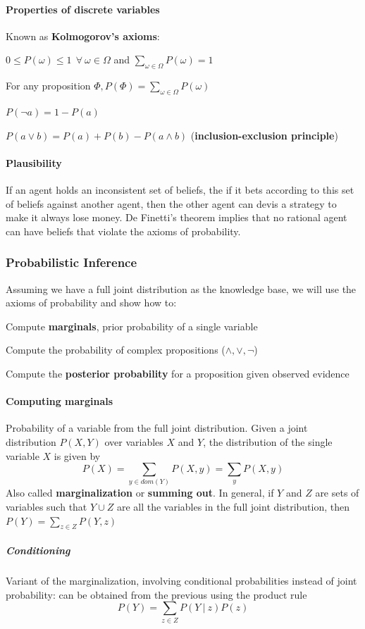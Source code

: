 \documentclass[10pt]{report}
\begin{document}
\paragraph{Properties of discrete variables} Known as \textbf{Kolmogorov's axioms}:
\begin{list}{}{}
	\item $0\leq P(\omega)\leq 1\:\:\forall\:\omega\in\Omega$ and $\sum_{\omega\in\Omega}P(\omega)=1$
	\item For any proposition $\Phi,P(\Phi)=\sum_{\omega\in\Omega}P(\omega)$
	\item $P(\neg a)=1-P(a)$
	\item $P(a\vee b) = P(a) + P(b) - P(a\wedge b)$ (\textbf{inclusion-exclusion principle})
\end{list}
\paragraph{Plausibility} If an agent holds an inconsistent set of beliefs, the if it bets according to this set of beliefs against another agent, then the other agent can devis a strategy to make it always lose money. De Finetti's theorem implies that no rational agent can have beliefs that violate the axioms of probability.
\subsubsection{Probabilistic Inference} Assuming we have a full joint distribution as the knowledge base, we will use the axioms of probability and show how to:
\begin{list}{}{}
	\item Compute \textbf{marginals}, prior probability of a single variable
	\item Compute the probability of complex propositions ($\wedge,\vee,\neg$)
	\item Compute the \textbf{posterior probability} for a proposition given observed evidence
\end{list}
\paragraph{Computing marginals} Probability of a variable from the full joint distribution. Given a joint distribution $P(X,Y)$ over variables $X$ and $Y$, the distribution of the single variable $X$ is given by $$P(X) = \sum_{y\in dom(Y)}P(X,y) = \sum_y P(X,y)$$
Also called \textbf{marginalization} or \textbf{summing out}. In general, if $Y$ and $Z$ are sets of variables such that $Y\cup Z$ are all the variables in the full joint distribution, then $P(Y) = \sum_{z\in Z}P(Y,z)$
\subparagraph{Conditioning} Variant of the marginalization, involving conditional probabilities instead of joint probability: can be obtained from the previous using the product rule $$P(Y) = \sum_{z\in Z} P(Y\:|\:z)P(z)$$
\end{document}

